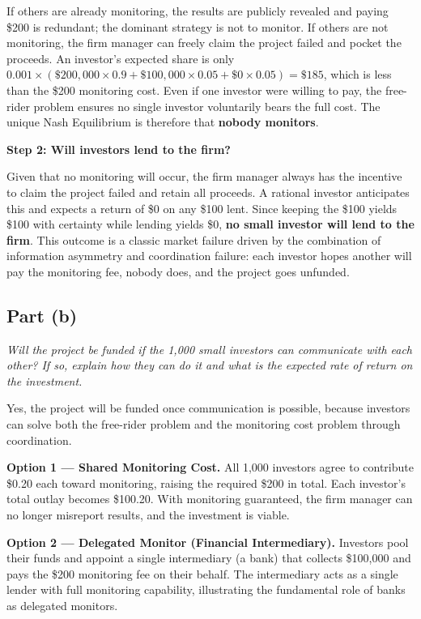 \documentclass[a4paper]{article}
\begin{document}
If others are already monitoring, the results are publicly revealed and
paying \$200 is redundant; the dominant strategy is not to monitor. If
others are not monitoring, the firm manager can freely claim the project
failed and pocket the proceeds. An investor's expected share is only
\(0.001 \times (\$200{,}000 \times 0.9 + \$100{,}000 \times 0.05 + \$0 \times
0.05) = \$185\), which is less than the \$200 monitoring cost. Even if one
investor were willing to pay, the free-rider problem ensures no single
investor voluntarily bears the full cost. The unique Nash Equilibrium is
therefore that \textbf{nobody monitors}.

\medskip
\textbf{Step 2: Will investors lend to the firm?}

Given that no monitoring will occur, the firm manager always has the
incentive to claim the project failed and retain all proceeds. A rational
investor anticipates this and expects a return of \$0 on any \$100 lent. Since
keeping the \$100 yields \$100 with certainty while lending yields \$0,
\textbf{no small investor will lend to the firm}. This outcome is a classic
market failure driven by the combination of information asymmetry and
coordination failure: each investor hopes another will pay the monitoring
fee, nobody does, and the project goes unfunded.

\subsection{Part (b)}

\textit{Will the project be funded if the 1,000 small investors can
communicate with each other? If so, explain how they can do it and what is
the expected rate of return on the investment.}

\medskip
Yes, the project will be funded once communication is possible, because
investors can solve both the free-rider problem and the monitoring cost problem
through coordination.

\medskip
\textbf{Option 1 --- Shared Monitoring Cost.}
All 1,000 investors agree to contribute \$0.20 each toward monitoring,
raising the required \$200 in total. Each investor's total outlay becomes
\$100.20. With monitoring guaranteed, the firm manager can no longer
misreport results, and the investment is viable.

\medskip
\textbf{Option 2 --- Delegated Monitor (Financial Intermediary).}
Investors pool their funds and appoint a single intermediary (a bank) that
collects \$100,000 and pays the \$200 monitoring fee on their behalf. The
intermediary acts as a single lender with full monitoring capability,
illustrating the fundamental role of banks as delegated monitors.
\end{document}
